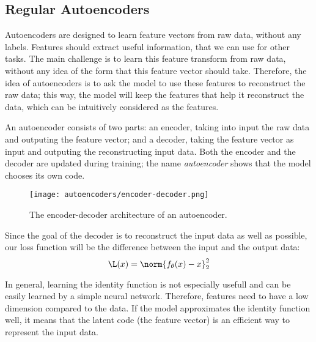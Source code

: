 \subsection{Regular Autoencoders}
Autoencoders are designed to learn feature vectors from raw data, without any labels. Features should extract useful information, that we can use for other tasks. The main challenge is to learn this feature transform from raw data, without any idea of the form that this feature vector should take. Therefore, the idea of autoencoders is to ask the model to use these features to reconstruct the raw data; this way, the model will keep the features that help it reconstruct the data, which can be intuitively considered as the  features.

An autoencoder consists of two parts: an encoder, taking into input the raw data and outputing the feature vector; and a decoder, taking the feature vector as input and outputing the reconstructing input data. Both the encoder and the decoder are updated during training; the name \emph{autoencoder} shows that the model chooses its own code.
\begin{figure}[H]
    \centering
    \texttt{[image: autoencoders/encoder-decoder.png]}
    \caption{The encoder-decoder architecture of an autoencoder.}
\end{figure}
Since the goal of the decoder is to reconstruct the input data as well as possible, our loss function will be the difference between the input and the output data:
\begin{equation*}
    \L(x) = \norm{f_\theta(x)-x}_2^2
\end{equation*}

In general, learning the identity function is not especially usefull and can be easily learned by a simple neural network. Therefore, features need to have a low dimension compared to the data. If the model approximates the identity function well, it means that the latent code (the feature vector) is an efficient way to represent the input data.



\newpage